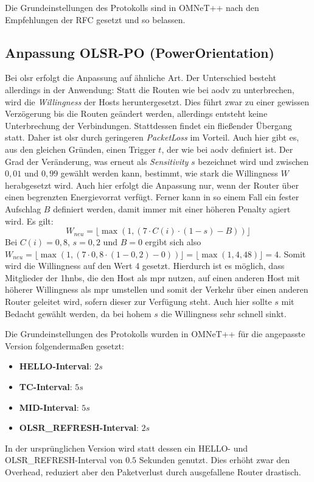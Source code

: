 Die Grundeinstellungen des Protokolls sind in OMNeT++ nach den Empfehlungen der RFC gesetzt und so belassen.

\subsection{Anpassung OLSR-PO (PowerOrientation)}
\label{chapter:versuch:aufbau:anpassungen-olsr}

Bei \gls{olsr} erfolgt die Anpassung auf ähnliche Art. Der Unterschied besteht allerdings in der Anwendung: Statt die Routen wie bei \gls{aodv} zu unterbrechen, wird die \textit{Willingness} der Hosts heruntergesetzt. Dies führt zwar zu einer gewissen Verzögerung bis die Routen geändert werden, allerdings entsteht keine Unterbrechung der Verbindungen. Stattdessen findet ein fließender Übergang statt. Daher ist \gls{olsr} durch geringeren \textit{PacketLoss} im Vorteil. Auch hier gibt es, aus den gleichen Gründen, einen Trigger $t$, der wie bei \gls{aodv} definiert ist. Der Grad der Veränderung, was erneut als \textit{Sensitivity} $s$ bezeichnet wird und zwischen $0{,}01$ und $0{,}99$ gewählt werden kann, bestimmt, wie stark die Willingness $W$ herabgesetzt wird. Auch hier erfolgt die Anpassung nur, wenn der Router über einen begrenzten Energievorrat verfügt. Ferner kann in so einem Fall ein fester Aufschlag $B$ definiert werden, damit immer mit einer höheren Penalty agiert wird. Es gilt:
\begin{displaymath}
W_{neu} = \lfloor\max(1,(7\cdot C(i)\cdot (1-s)-B))\rfloor
\end{displaymath}
Bei $C(i) = 0{,}8$, $s = 0{,}2$ und $B=0$ ergibt sich also $W_{neu} = \lfloor\max(1,(7\cdot 0{,}8\cdot (1-0{,}2)-0))\rfloor = \lfloor\max(1,4{,}48)\rfloor = 4$. Somit wird die Willingness auf den Wert 4 gesetzt. Hierdurch ist es möglich, dass Mitglieder der \glspl{1hnb}, die den Host als \gls{mpr} nutzen, auf einen anderen Host mit höherer Willingness als \gls{mpr} umstellen und somit der Verkehr über einen anderen Router geleitet wird, sofern dieser zur Verfügung steht. Auch hier sollte $s$ mit Bedacht gewählt werden, da bei hohem $s$ die Willingness sehr schnell sinkt.\newline

Die Grundeinstellungen des Protokolls wurden in OMNeT++ für die angepasste Version folgendermaßen gesetzt:
\begin{itemize}
\item \textbf{HELLO-Interval}: $2s$
\item \textbf{TC-Interval}: $5s$
\item \textbf{MID-Interval}: $5s$
\item \textbf{OLSR\_REFRESH-Interval}: $2s$
\end{itemize}

In der ursprünglichen Version wird statt dessen ein HELLO- und OLSR\_REFRESH-Interval von $0.5$ Sekunden genutzt. Dies erhöht zwar den Overhead, reduziert aber den Paketverlust durch ausgefallene Router drastisch.

